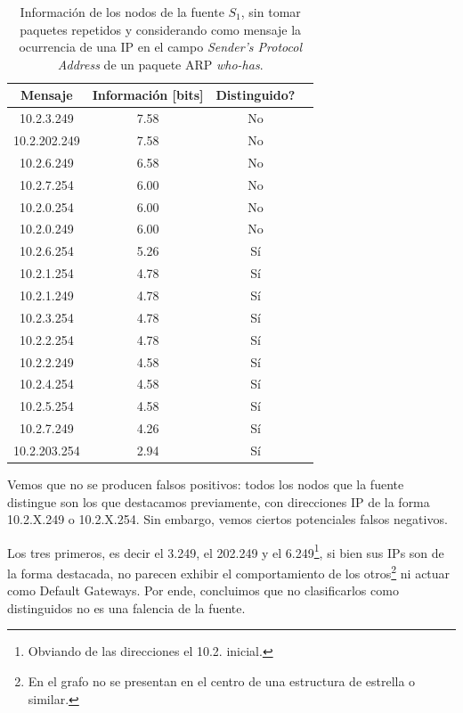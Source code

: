 \begin{table}[t]
    \centering
    \begin{tabular}{ | c | c | c | l |}
        \hline
        Mensaje & Información [bits] & Distinguido?\\
        \hline
        10.2.3.249 & 7.58 & No \\ %
        \hline
        10.2.202.249 & 7.58 & No \\ %
        \hline
        10.2.6.249 & 6.58 & No \\ %
        \hline
        10.2.7.254 & 6.00 & No \\
        \hline
        10.2.0.254 & 6.00 & No \\
        \hline
        10.2.0.249 & 6.00 & No \\
        \hline
        10.2.6.254 & 5.26 & Sí \\
        \hline
        10.2.1.254 & 4.78 & Sí \\
        \hline
        10.2.1.249 & 4.78 & Sí \\
        \hline
        10.2.3.254 & 4.78 & Sí \\
        \hline
        10.2.2.254 & 4.78 & Sí \\
        \hline
        10.2.2.249 & 4.58 & Sí \\
        \hline
        10.2.4.254 & 4.58 & Sí \\
        \hline
        10.2.5.254 & 4.58 & Sí \\
        \hline
        10.2.7.249 & 4.26 & Sí \\
        \hline
        10.2.203.254 & 2.94 & Sí \\
        \hline
    \end{tabular} 
    \caption{Información de los nodos de la fuente $S_1$, sin tomar paquetes repetidos y considerando como mensaje la ocurrencia de una IP en el campo \textit{Sender's Protocol Address} de un paquete ARP \textit{who-has}.}
    \label{tab1SinRSinA}
\end{table} 

\par Vemos que no se producen falsos positivos: todos los nodos que la fuente distingue son los que destacamos previamente, con direcciones IP de la forma 10.2.X.249 o 10.2.X.254.
Sin embargo, vemos ciertos potenciales falsos negativos.

\par Los tres primeros, es decir el 3.249, el 202.249 y el 6.249\footnote{Obviando de las direcciones el 10.2. inicial.}, si bien sus IPs son de la forma destacada, no parecen exhibir el comportamiento de los otros\footnote{En el grafo no se presentan en el centro de una estructura de estrella o similar.} ni actuar como Default Gateways.
Por ende, concluimos que no clasificarlos como distinguidos no es una falencia de la fuente.


